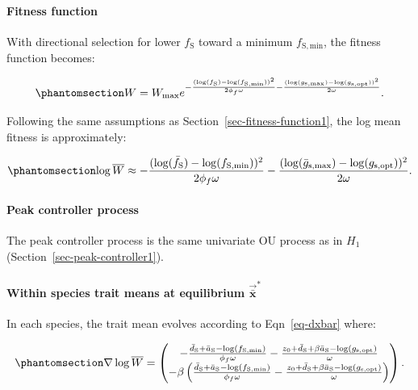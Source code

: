 \documentclass[
  letterpaper,
  DIV=11,
  numbers=noendperiod]{scrartcl}
\let\oldparagraph\paragraph
\renewcommand{\paragraph}[1]{\oldparagraph{#1}\mbox{}}
\begin{document}
\paragraph{Fitness function}\label{sec-fitness-function2}

With directional selection for lower \(f_\mathrm{S}\) toward a minimum
\(f_\mathrm{S,min}\), the fitness function becomes:

\begin{equation}\phantomsection\label{eq-W2}{W = W_\mathrm{max} e ^ {-\frac{(\log (f_\mathrm{S}) - \log (f_\mathrm{S,min})) ^ 2}{2 \phi_f \omega} - \frac{(\log (g_\mathrm{s,max}) - \log (g_\mathrm{s,opt})) ^ 2}{2 \omega}}.}\end{equation}

Following the same assumptions as Section~\ref{sec-fitness-function1},
the log mean fitness is approximately:

\begin{equation}\phantomsection\label{eq-logW2}{\log \overline{W} \approx -\frac{(\log (\bar{f}_\mathrm{S}) - \log (f_\mathrm{S,min})) ^ 2}{2 \phi_f \omega} -\frac{(\log (\bar{g}_\mathrm{s,max}) - \log (g_\mathrm{s,opt})) ^ 2}{2 \omega}.}\end{equation}

\paragraph{Peak controller process}\label{sec-peak-controller2}

The peak controller process is the same univariate OU process as in
\(H_1\) (Section~\ref{sec-peak-controller1}).

\paragraph{\texorpdfstring{Within species trait means at equilibrium
\(\vec{\bar{\mathbf{x}}}^*\)}{Within species trait means at equilibrium \textbackslash vec\{\textbackslash bar\{\textbackslash mathbf\{x\}\}\}\^{}*}}\label{within-species-trait-means-at-equilibrium-vecbarmathbfx-1}

In each species, the trait mean evolves according to Eqn~\ref{eq-dxbar}
where:

\begin{equation}\phantomsection\label{eq-dellogW2}{\nabla \log \overline{W} = \begin{pmatrix} -\frac{\bar{d}_\mathrm{S} + \bar{a}_\mathrm{S} - \log(f_\mathrm{S,min})}{\phi_f \omega} - \frac{z_0 + \bar{d}_\mathrm{S} + \beta \bar{a}_\mathrm{S} - \log(g_\mathrm{s,opt})}{\omega} \\ - \beta \left( \frac{\bar{d}_\mathrm{S} + \bar{a}_\mathrm{S} - \log(f_\mathrm{S,min})}{\phi_f \omega} - \frac{z_0 + \bar{d}_\mathrm{S} + \beta \bar{a}_\mathrm{S} - \log(g_\mathrm{s,opt})}{\omega} \right) \end{pmatrix}.}\end{equation}
\end{document}
